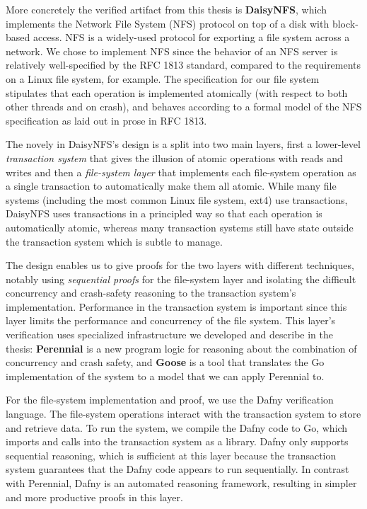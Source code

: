 More concretely the verified
artifact from this thesis is \textbf{DaisyNFS}, which implements the Network
File System (NFS) protocol on top of a disk with block-based access. NFS is a
widely-used protocol for exporting a file system across a network. We chose to
implement NFS since the behavior of an NFS server is relatively well-specified
by the RFC 1813 standard, compared to the requirements on a Linux file system,
for example. The specification for our file system stipulates that each
operation is implemented atomically (with respect to both other threads and on
crash), and behaves according to a formal model of the NFS specification as laid
out in prose in RFC 1813.

The novely in DaisyNFS's design is a split into two main layers, first a
lower-level \emph{transaction system} that gives the illusion of atomic
operations with reads and writes and then a \emph{file-system layer} that
implements each file-system operation as a single transaction to automatically
make them all atomic. While many file systems (including the most common Linux
file system, ext4) use transactions, DaisyNFS uses transactions in a principled
way so that each operation is automatically atomic, whereas many transaction
systems still have state outside the transaction system which is subtle to
manage.

The design enables us to give proofs for the two layers with different
techniques, notably using \emph{sequential proofs} for the file-system layer and
isolating the difficult concurrency and crash-safety reasoning to the
transaction system's implementation.
Performance in the transaction system is important since
this layer limits the performance and concurrency of the file system.
This layer's verification uses specialized infrastructure we developed
and describe in the thesis: \textbf{Perennial} is a new program logic
for reasoning about the combination of concurrency and crash safety, and
\textbf{Goose} is a tool that translates the Go implementation of the
system to a model that we can apply Perennial to.

For the file-system implementation and proof, we use the Dafny
verification language. The file-system operations interact with the
transaction system to store and retrieve data. To run the system, we
compile the Dafny code to Go, which imports and calls into the
transaction system as a library. Dafny only supports sequential
reasoning, which is sufficient at this layer because the transaction
system guarantees that the Dafny code appears to run sequentially. In contrast
with Perennial, Dafny is an automated reasoning framework, resulting in simpler
and more productive proofs in this layer.

